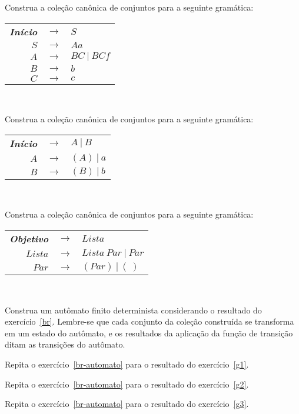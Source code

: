 \documentclass{compiladores}
\begin{document}
\begin{listanumerada}
\item \label{g1} Construa a coleção canônica de conjuntos para a seguinte gramática: \\
  \begin{tabular}{rcl}
    {\bf \emph{Início}} & $\rightarrow$ & $S$ \\
    $S$ & $\rightarrow$ & $Aa$ \\
    $A$ & $\rightarrow$ & $BC\ |\ BCf$ \\
    $B$ & $\rightarrow$ & $b$ \\
    $C$ & $\rightarrow$ & $c$ \\
  \end{tabular} \\

\item \label{g2} Construa a coleção canônica de conjuntos para a seguinte gramática: \\
  \begin{tabular}{rcl}
    {\bf \emph{Início}} & $\rightarrow$ & $A\ |\ B$\\
    $A$ & $\rightarrow$ & $( A )\ |\ a$ \\
    $B$ & $\rightarrow$ & $( B )\ |\ b$ \\
  \end{tabular} \\

\item \label{g3} Construa a coleção canônica de conjuntos para a seguinte gramática: \\
  \begin{tabular}{rcl}
    {\bf \emph{Objetivo}} & $\rightarrow$ & $Lista$ \\
    $Lista$ & $\rightarrow$ & $Lista\ Par\ |\ Par$ \\ 
    $Par$ & $\rightarrow$ & $( Par )\ |\ (\ )$ \\
  \end{tabular} \\

\item \label{br-automato} Construa um autômato finito determinista
  considerando o resultado do exercício~\ref{br}. Lembre-se que cada
  conjunto da coleção construída se transforma em um estado do
  autômato, e os resultados da aplicação da função de transição ditam
  as transições do autômato.

\item \label{g1-automato}Repita o exercício~\ref{br-automato} para o
  resultado do exercício~\ref{g1}.
\item \label{g2-automato}Repita o exercício~\ref{br-automato} para o
  resultado do exercício~\ref{g2}.
\item \label{g3-automato}Repita o exercício~\ref{br-automato} para o
  resultado do exercício~\ref{g3}.


\end{listanumerada}
\end{document}

